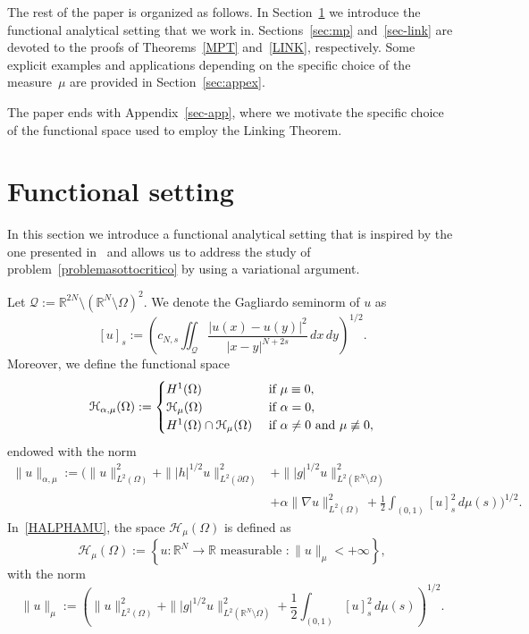 \documentclass[12pt,a4paper,intlimits,sumlimits]{amsart}
\def \R {\mathbb{R}}
\def \Q {\mathcal Q}
\theoremstyle{definition}
\theoremstyle{plain}
\numberwithin{equation}{section}
\begin{document}
\medskip

The rest of the paper is organized as follows. In Section~\ref{sec:func}
we introduce the functional analytical setting that we work in.
Sections~\ref{sec:mp} and~\ref{sec-link} are devoted
to the proofs of Theorems~\ref{MPT} and~\ref{LINK}, respectively.
Some explicit examples and applications depending on the  specific
choice of the measure~$\mu$ are provided in Section~\ref{sec:appex}.

The paper ends with Appendix~\ref {sec-app}, where
we motivate the specific choice of the functional space
used to employ the Linking Theorem.

\section{Functional setting}\label{sec:func}

In this section we introduce a functional analytical setting that is inspired by the one presented in~\cite[Section~2]{TUTTI} and allows us
to address the study of problem~\eqref{problemasottocritico} by using a variational argument.

Let $\Q:=\R^{2N}\setminus (\R^N\setminus \Omega)^2$. We denote the Gagliardo seminorm of $u$ as
\[
[u]_s:= \left({c_{N, s}}\iint_{\mathcal Q} \frac{|u(x)-u(y)|^2}{|x-y|^{N+2s}} \, dx\, dy\right)^{1/2}.
\]
Moreover, we define the functional space
\begin{equation}\label{HALPHAMU}
\mathcal H_{\alpha, \mu} (\Omega):= \begin{cases}
H^1(\Omega) &\hbox{ if } \mu \equiv 0,\\
\mathcal H_\mu (\Omega) &\hbox{ if } \alpha = 0,\\
H^1(\Omega)\cap \mathcal H_\mu (\Omega) &\hbox{ if }  \alpha\neq 0  \text{ and }
\mu \not\equiv 0,
\end{cases}
\end{equation}
endowed with the norm
\begin{equation}\label{normaalfamu}
\begin{split}
\|u\|_{\alpha, \mu} := \Bigg(\|u\|^2_{L^2(\Omega)} + \||h|^{1/2} u\|^2_{L^2(\partial\Omega)} &+ \| |g|^{1/2} u\|^2_{L^2(\R^N\setminus\Omega)} \\
&+ \alpha \|\nabla u\|^2_{L^2(\Omega)} +\frac12 \int_{(0, 1)} [u]_s^2 \, d\mu(s) \Bigg)^{1/2}.
\end{split}
\end{equation}
In~\eqref{HALPHAMU}, the space $\mathcal H_\mu (\Omega)$ is defined
as
\begin{equation}\label{Hmu}
\mathcal H_\mu (\Omega):= \left\lbrace u:\R^N\to\R \text{ measurable } : \|u\|_\mu <+\infty \right\rbrace,
\end{equation}
with the norm
\begin{equation}\label{normamu}
\|u\|_\mu := \left(\|u\|^2_{L^2(\Omega)} + \| |g|^{1/2} u\|^2_{L^2(\R^N\setminus\Omega)} +\frac12\int_{(0, 1)} [u]_s^2 \, d\mu(s) \right)^{1/2}.
\end{equation}
\end{document}
